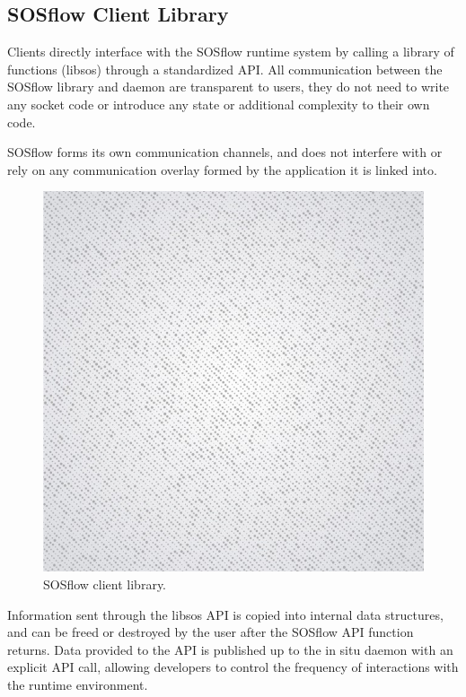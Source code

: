 \subsection{SOSflow Client Library}
%
Clients directly interface with the SOSflow runtime system by calling a 
library of functions (libsos) through a standardized API.
%
All communication between the SOSflow library and daemon are transparent
to users, they do not need to write any socket code or introduce any
state or additional complexity to their own code.
%
%
\par
{}
%
SOSflow forms its own communication channels, and does not interfere
with or rely on any communication overlay formed by the application it is
linked into.
%
\begin{figure}[h]
\centering
\includegraphics[width=\columnwidth]{images/placeholder.jpg}
\caption{SOSflow client library.}
\label{fig_client_library}
\end{figure}
%
Information sent through the libsos API is copied into internal data
structures, and can be freed or destroyed by the user after the SOSflow
API function returns.
%
Data provided to the API is published up to the in situ daemon with
an explicit API call, allowing developers to control the frequency
of interactions with the runtime environment.
